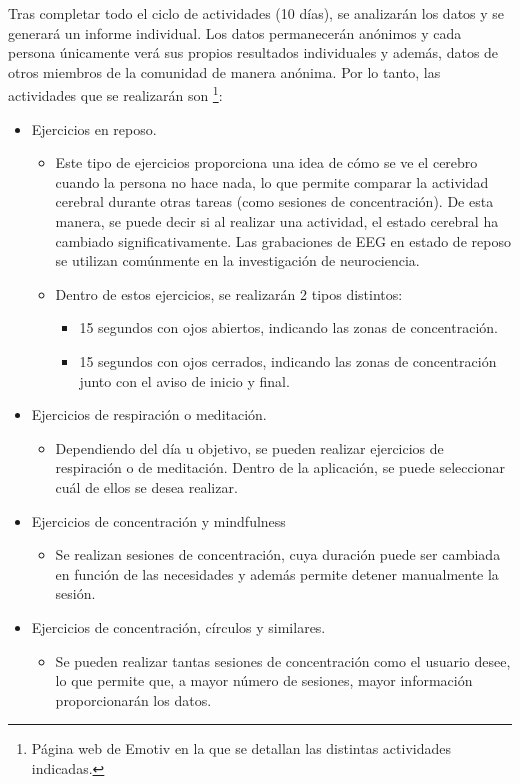 Tras completar todo el ciclo de actividades (10 días), se analizarán los datos y se generará un informe individual. Los datos permanecerán anónimos y cada persona únicamente verá sus propios resultados individuales y además, datos de otros miembros de la comunidad de manera anónima. Por lo tanto, las actividades que se realizarán son \cite{actividades}\footnote{Página web de Emotiv en la que se detallan las distintas actividades indicadas\cite{actividades}.}:
\begin{itemize}
    \item Ejercicios en reposo.
    \begin{itemize}
        \item Este tipo de ejercicios proporciona una idea de cómo se ve el cerebro cuando la persona no hace nada, lo que permite comparar la actividad cerebral durante otras tareas (como sesiones de concentración). De esta manera, se puede decir si al realizar una actividad, el estado cerebral ha cambiado significativamente. Las grabaciones de EEG en estado de reposo se utilizan comúnmente en la investigación de neurociencia.
        \item Dentro de estos ejercicios, se realizarán 2 tipos distintos:
        \begin{itemize}
            \item 15 segundos con ojos abiertos, indicando las zonas de concentración.
            \item 15 segundos con ojos cerrados, indicando las zonas de concentración junto con el aviso de inicio y final.
        \end{itemize}
    \end{itemize}
    \item Ejercicios de respiración o meditación.
    \begin{itemize}
        \item Dependiendo del día u objetivo, se pueden realizar ejercicios de respiración o de meditación. Dentro de la aplicación, se puede seleccionar cuál de ellos se desea realizar.
    \end{itemize}
    \item Ejercicios de concentración y mindfulness
        \begin{itemize}
            \item Se realizan sesiones de concentración, cuya duración puede ser cambiada en función de las necesidades y además permite detener manualmente la sesión.
        \end{itemize}
    \item Ejercicios de concentración, círculos y similares.
        \begin{itemize}
            \item Se pueden realizar tantas sesiones de concentración como el usuario desee, lo que permite que, a mayor número de sesiones, mayor información proporcionarán los datos.
        \end{itemize}
\end{itemize}

